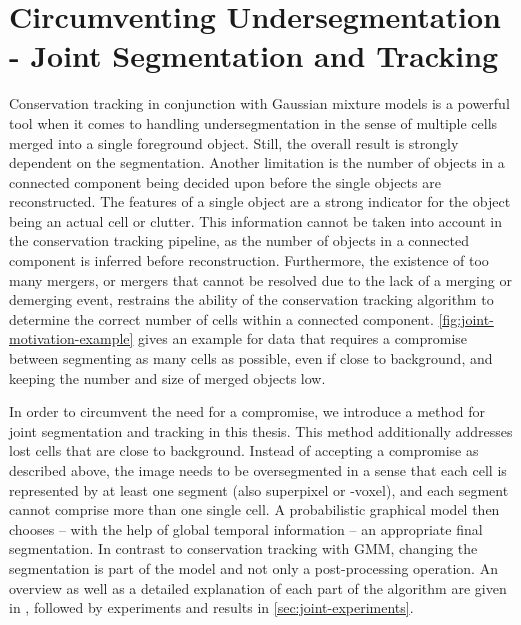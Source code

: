\chapter{Circumventing Undersegmentation - Joint Segmentation and Tracking}
\label{cha:joint}

Conservation tracking in conjunction with Gaussian mixture models is a powerful tool when it comes
to handling undersegmentation in the sense of multiple cells merged into a single foreground
object. Still, the overall result is strongly dependent on the segmentation. Another limitation is
the number of objects in a connected component being decided upon before the single objects are
reconstructed. The features of a single object are a strong indicator for the object being an actual
cell or clutter. This information cannot be taken into account in the conservation tracking
pipeline, as the number of objects in a connected component is inferred before
reconstruction. Furthermore, the existence of too many mergers, or mergers that cannot be resolved
due to the lack of a merging or demerging event, restrains the ability of the conservation tracking
algorithm to determine the correct number of cells within a connected
component. \cref{fig:joint-motivation-example} gives an example for data that requires a compromise
between segmenting as many cells as possible, even if close to background, and keeping the number
and size of merged objects low.

In order to circumvent the need for a compromise, we introduce a method for joint segmentation and
tracking in this thesis. This method additionally addresses lost cells that are close to
background. Instead of accepting a compromise as described above, the image needs to be
oversegmented in a sense that each cell is represented by at least one segment (also superpixel or
-voxel), and each segment cannot comprise more than one single cell. A probabilistic graphical model
then chooses -- with the help of global temporal information -- an appropriate final
segmentation. In contrast to conservation tracking with GMM, changing the segmentation is part of
the model and not only a post-processing operation. An overview as well as a detailed explanation of
each part of the algorithm are given in ,
followed by experiments and results in \cref{sec:joint-experiments}.


